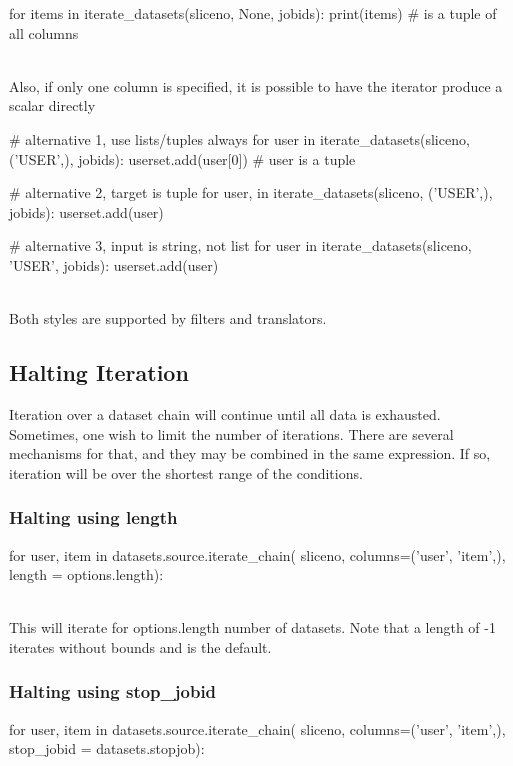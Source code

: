 \begin{python}
for items in iterate_datasets(sliceno, None, jobids):
    print(items)  # is a tuple of all columns
\end{python}
\\
Also, if only one column is specified, it is possible to have the
iterator produce a scalar directly

\begin{python}
# alternative 1, use lists/tuples always
for user in iterate_datasets(sliceno, ('USER',), jobids):
    userset.add(user[0])  # user is a tuple

# alternative 2, target is tuple
for user, in iterate_datasets(sliceno, ('USER',), jobids):
    userset.add(user)

# alternative 3, input is string, not list
for user in iterate_datasets(sliceno, 'USER', jobids):
    userset.add(user)
\end{python}
\\
Both styles are supported by filters and translators.




\subsection{Halting Iteration}

Iteration over a dataset chain will continue until all data is
exhausted.  Sometimes, one wish to limit the number of iterations.
There are several mechanisms for that, and they may be combined in the
same expression.  If so, iteration will be over the shortest range of
the conditions.

\subsubsection*{Halting using length}
\begin{python}
for user, item in datasets.source.iterate_chain(
    sliceno,
    columns=('user', 'item',),
    length = options.length):
\end{python}
\\
This will iterate for options.length number of datasets.  Note that a
length of -1 iterates without bounds and is the default.


\subsubsection*{Halting using stop\_jobid}
\begin{python}
for user, item in datasets.source.iterate_chain(
    sliceno,
    columns=('user', 'item',),
    stop_jobid = datasets.stopjob):
\end{python}

